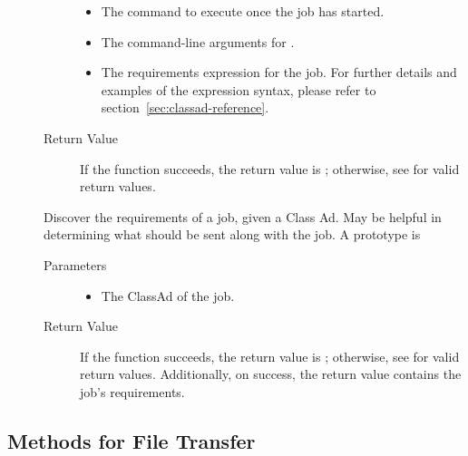 \begin{description}
\begin{description}
\begin{itemize}
      
      \item {} 
      The command to execute once the job has started.
      \item {}
      The command-line arguments for .
      \item {}
      The requirements expression for the job. For further details 
      and examples of the expression syntax, please refer to 
      section~\ref{sec:classad-reference}.
    \end{itemize}
    \item[ Return Value]
      If the function succeeds, the return value is ; 
      otherwise, see  for valid return values. 
  \end{description}
 
\item [\Code{discoverJobRequirements}]
  Discover the requirements of a job, given a Class Ad.  May be helpful 
  in determining what should be sent along with the job. 
  A prototype is 


  \begin{description}
    \item[ Parameters]
    \begin{itemize}
      \item {} The ClassAd of the job.
    \end{itemize}
    \item[ Return Value]
      If the function succeeds, the return value is ; 
      otherwise, see  for valid return values. Additionally,
      on success, the return value contains the job's requirements.
  \end{description}    

\end{description}

\subsection{\label{WebService-FileTransfer} Methods for File Transfer}

